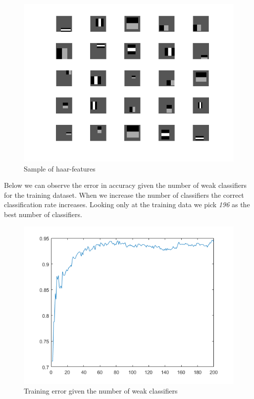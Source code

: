 \documentclass[a4paper,12pt]{article}
\begin{document}
\begin{figure}[H]
\begin{minipage}[]{0.8\textwidth}
  \end{minipage}
\end{figure}
\begin{figure}[H]
\centering
\caption{Sample of haar-features}\label{fig:sample_haar_features}
  \begin{minipage}[]{0.8\textwidth}
  \includegraphics[width=\textwidth]{figures/sample_of_haar_features.png}
  \end{minipage}
\end{figure}

Below we can observe the error in accuracy given the number of weak classifiers for the training dataset. When we increase the number of classifiers the correct classification rate increases. Looking only at the training data we pick \textit{196} as the best number of classifiers.

\begin{figure}[H]
\centering
\caption{Training error given the number of weak classifiers}\label{fig:train_error}
  \begin{minipage}[]{0.80\textwidth}
  \includegraphics[width=\textwidth]{figures/train_error.png}
  \end{minipage}
\end{figure}
\end{document}
